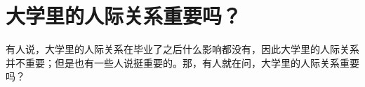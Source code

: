 \section{大学里的人际关系重要吗？}\label{sec:Uncategorized/IsUniversityInterpersonImportant}
%
%
    有人说，大学里的人际关系在毕业了之后什么影响都没有，因此大学里的人际关系并不重要；但是也有一些人说挺重要的。那，有人就在问，大学里的人际关系重要吗？
